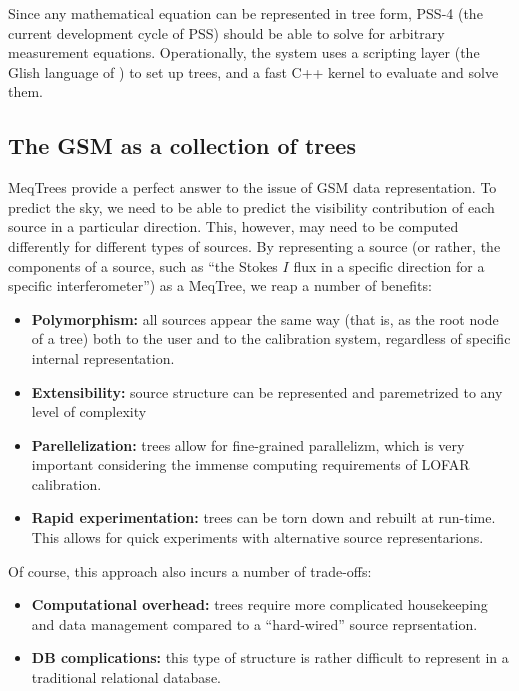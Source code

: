 \documentclass[11pt,twoside]{article}  %
\begin{document}
Since any mathematical equation can be represented in tree form, PSS-4 (the
current development cycle of PSS) should be able to solve for arbitrary
measurement equations. Operationally, the system uses a scripting layer (the
Glish language of
)  to set up
trees, and a fast C++ kernel to evaluate and solve them.

\subsection{The GSM as a collection of trees}

MeqTrees provide a perfect answer to the issue of GSM data representation. To
predict the sky, we need to be able to predict the visibility contribution of
each source in a particular direction. This, however, may need to be computed
differently for different types of sources. By representing a source (or rather,
the components of a source, such as ``the Stokes $I$ flux in a specific
direction for a specific interferometer'') as a MeqTree, we reap a number of 
benefits:

\begin{itemize}

\item {\bf Polymorphism:} all sources appear the same way (that is, as the root node of
a tree) both to the user and to the calibration system, regardless of specific
internal representation.

\item {\bf Extensibility:} source structure can be represented and paremetrized to
any level of complexity

\item {\bf Parellelization:} trees allow for fine-grained parallelizm, which is very
important considering the immense computing requirements of LOFAR calibration.

\item {\bf Rapid experimentation:} trees can be torn down and rebuilt at run-time. This
allows for quick experiments with alternative source representarions.

\end{itemize}

Of course, this approach also incurs a number of trade-offs:

\begin{itemize}

\item {\bf Computational overhead:} trees require more complicated housekeeping and
data management compared to a ``hard-wired'' source reprsentation.

\item {\bf DB complications:} this type of structure is rather difficult to represent
in a traditional relational database.

\end{itemize}
\end{document}
